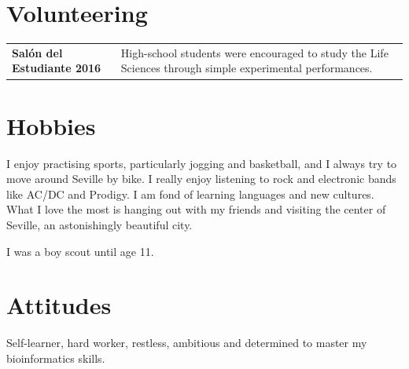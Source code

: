 \documentclass[letterpaper]{article}
\renewenvironment{itemize}{
  \begin{list}{}{
    \setlength{\leftmargin}{1em}
  }
}{
  \end{list}
}
\begin{document}
\renewcommand{\arraystretch}{1}

\section*{Volunteering}

\renewcommand{\arraystretch}{1.5}
\vspace{-1.5\baselineskip}
\begin{table}[!h]

\begin{centering}
\begin{longtable}{>{\bfseries}l p{4in}}

Sal\'on del Estudiante 2016 & High-school students were encouraged to study the Life Sciences through simple experimental performances. \\
\end{longtable}
\end{centering}
\end{table}
\renewcommand{\arraystretch}{1}


\section*{Hobbies}
\begin{itemize}
\vspace{0.1cm}
\item I enjoy practising sports, particularly jogging and basketball, and I always try to move around Seville by bike. I really enjoy listening to rock and electronic bands like AC/DC and Prodigy. I am fond of learning languages and new cultures. What I love the most is hanging out with my friends and visiting the center of Seville, an astonishingly beautiful city. 

I was a boy scout until age 11.


\end{itemize}

\section*{Attitudes}

\begin{itemize}
\item Self-learner, hard worker, restless, ambitious  and determined to master my bioinformatics skills.
\end{itemize}
\end{document}
